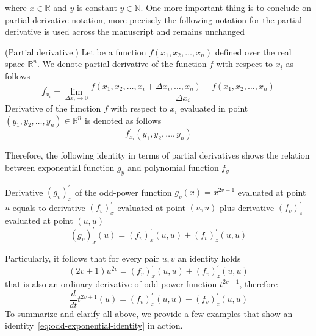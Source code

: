 where $x\in \mathbb{R}$ and $y$ is constant $y\in \mathbb{N}$.
One more important thing is to conclude on partial derivative notation,
more precisely the following notation for the partial derivative is used across the manuscript and remains unchanged
\begin{notation} (Partial derivative.)
    Let be a function $f(x_1, x_2, \dots, x_n)$ defined over the real space $\mathbb{R}^n$.
    We denote partial derivative of the function $f$ with respect to $x_i$ as follows
    \begin{equation*}
        f^{'}_{x_i} = \lim_{\Delta x_i \to 0} \frac{f(x_1, x_2, \dots, x_i + \Delta x_i, \dots, x_n) - f(x_1, x_2, \dots, x_n)}{\Delta x_i}
    \end{equation*}
    Derivative of the function $f$ with respect to $x_i$
    evaluated in point $(y_1, y_2, \dots, y_n) \in \mathbb{R}^n$ is denoted as follows
    \begin{equation*}
        f^{'}_{x_i} (y_1, y_2, \dots, y_n)
    \end{equation*}
\end{notation}
Therefore, the following identity in terms of partial derivatives shows the relation between exponential function $g_{y}$ and
polynomial function $f_{y}$
\begin{thm}
    Derivative $(g_v)^{'}_{x}$ of the odd-power function $g_v(x) = x^{2v + 1}$ evaluated
    at point $u$ equals to derivative $(f_{v})^{'}_{x}$ evaluated at point $(u, u)$ plus
    derivative $(f_{v})^{'}_{z}$ evaluated at point $(u, u)$
    \begin{equation}
    (g_v)
        ^{'}_{x} (u) = (f_{v})^{'}_{x} (u, u) + (f_{v})^{'}_{z} (u, u)
        \label{eq:odd-exponential-identity}
    \end{equation}
\end{thm}
Particularly, it follows that for every pair $u, v$ an identity holds
\begin{equation}
    \label{eq:equation}
    (2v+1)u^{2v} = (f_{v})^{'}_{x} (u, u) + (f_{v})^{'}_{z} (u, u)
\end{equation}
that is also an ordinary derivative of odd-power function $t^{2v+1}$, therefore
\begin{equation*}
    \frac{d}{dt} t^{2v+1} (u) = (f_{v})^{'}_{x} (u, u) + (f_{v})^{'}_{z} (u, u)
\end{equation*}
To summarize and clarify all above, we provide a few examples that show an identity~\eqref{eq:odd-exponential-identity}
in action.
